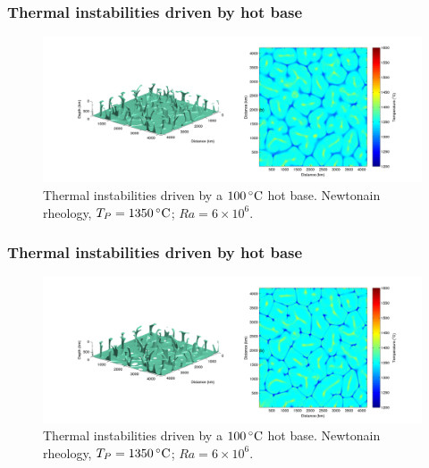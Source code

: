 \documentclass[aspectratio=169]{beamer}
\begin{document}
\begin{frame}
    \frametitle{Thermal instabilities driven by hot base}
    \begin{figure}
        \vspace{-.5cm}
        \includegraphics[width=0.85\paperwidth]{./figures/Newt100/dT1.0741_4x4_Newt_Ra6e6_6.png}
        \caption{Thermal instabilities driven by a $100\rm\,^{\circ}C$ hot base. Newtonain rheology, $T_{P}=1350\rm\,^{\circ}C$; $Ra = 6\times10^{6}$.}
    \end{figure}
\end{frame}

\begin{frame}
    \frametitle{Thermal instabilities driven by hot base}
    \begin{figure}
        \vspace{-.5cm}
        \includegraphics[width=0.85\paperwidth]{./figures/Newt100/dT1.0741_4x4_Newt_Ra6e6_7.png}
        \caption{Thermal instabilities driven by a $100\rm\,^{\circ}C$ hot base. Newtonain rheology, $T_{P}=1350\rm\,^{\circ}C$; $Ra = 6\times10^{6}$.}
    \end{figure}
\end{frame}
\end{document}

